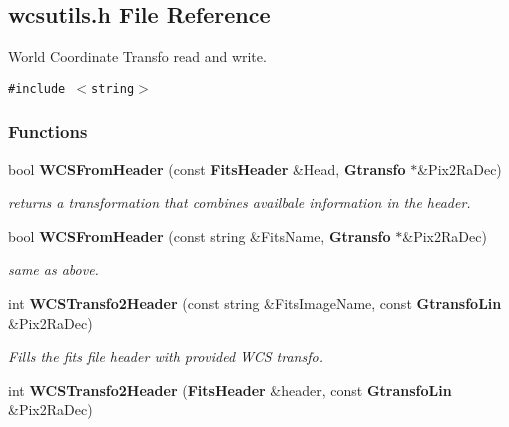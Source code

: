 \subsection{wcsutils.h File Reference}
\label{wcsutils_h}
World Coordinate Transfo read and write. 


{\tt \#include $<$string$>$}\par
\subsubsection*{Functions}
\begin{CompactItemize}
\item 
{}
bool {\bf WCSFrom\-Header} (const {\bf Fits\-Header} \&Head, {\bf Gtransfo} $\ast$\&Pix2Ra\-Dec)\label{wcsutils_h_a0}

\begin{CompactList}\small\item\em returns a transformation that combines availbale information in the header.\item\end{CompactList}\item 
{}
bool {\bf WCSFrom\-Header} (const string \&Fits\-Name, {\bf Gtransfo} $\ast$\&Pix2Ra\-Dec)\label{wcsutils_h_a1}

\begin{CompactList}\small\item\em same as above.\item\end{CompactList}\item 
{}
int {\bf WCSTransfo2Header} (const string \&Fits\-Image\-Name, const {\bf Gtransfo\-Lin} \&Pix2Ra\-Dec)\label{wcsutils_h_a2}

\begin{CompactList}\small\item\em Fills the fits file header with provided WCS transfo.\item\end{CompactList}\item 
{}
int {\bf WCSTransfo2Header} ({\bf Fits\-Header} \&header, const {\bf Gtransfo\-Lin} \&Pix2Ra\-Dec)\label{wcsutils_h_a3}


\end{CompactItemize}

